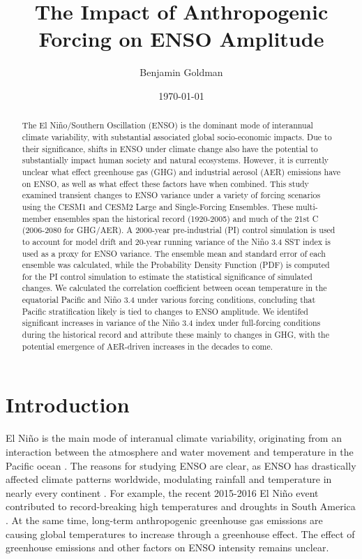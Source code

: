 \documentclass[11pt]{article}
\author{Benjamin Goldman}
\date{\today}
\title{The Impact of Anthropogenic Forcing on ENSO Amplitude}
\begin{document}
\maketitle
\begin{abstract}
The El Niño/Southern Oscillation (ENSO) is the dominant mode of interannual climate variability, with substantial associated global socio-economic impacts. Due to their significance, shifts in ENSO under climate change also have the potential to substantially impact human society and natural ecosystems. However, it is currently unclear what effect greenhouse gas (GHG) and industrial aerosol (AER) emissions have on ENSO, as well as what effect these factors have when combined. This study examined transient changes to ENSO variance under a variety of forcing scenarios using the CESM1 and CESM2 Large and Single-Forcing Ensembles. These multi-member ensembles span the historical record (1920-2005) and much of the 21st C (2006-2080 for GHG/AER). A 2000-year pre-industrial (PI) control simulation is used to account for model drift and 20-year running variance of the Niño 3.4 SST index is used as a proxy for ENSO variance. The ensemble mean and standard error of each ensemble was calculated, while the Probability Density Function (PDF) is computed for the PI control simulation to estimate the statistical significance of simulated changes. We calculated the correlation coefficient between ocean temperature in the equatorial Pacific and Niño 3.4 under various forcing conditions, concluding that Pacific stratification likely is tied to changes to ENSO amplitude. We identifed significant increases in variance of the Niño 3.4 index under full-forcing conditions during the historical record and attribute these mainly to changes in GHG, with the potential emergence of AER-driven increases in the decades to come.
\end{abstract}

\section{Introduction}
\label{sec:orgf2c8c6a}

El Niño is the main mode of interanual climate variability, originating from an interaction between the atmosphere and water movement and temperature in the Pacific ocean \citep{bjerknes1969atmospheric}. The reasons for studying ENSO are clear, as ENSO has drastically affected climate patterns worldwide, modulating rainfall and temperature in nearly every continent \citep{ropelewski1987global}. For example, the recent 2015-2016 El Niño event contributed to record-breaking high temperatures and droughts in South America \citep{jimenez2016record}. At the same time, long-term anthropogenic greenhouse gas emissions are causing global temperatures to increase through a greenhouse effect. The effect of greenhouse emissions and other factors on ENSO intensity remains unclear.
\end{document}
